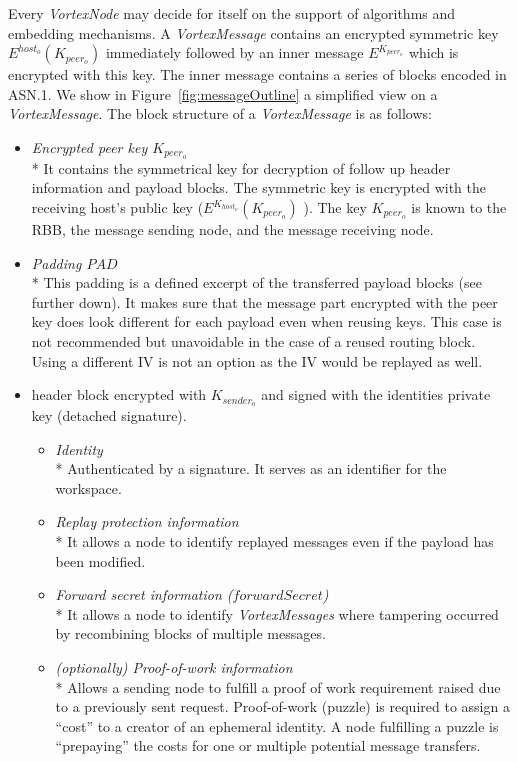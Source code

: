 \documentclass[acmsmall, screen, final]{acmart}
\begin{document}
	Every \emph{VortexNode} may decide for itself on the support of algorithms and embedding mechanisms. A \emph{VortexMessage} contains an encrypted symmetric key $E^{host_o}\left(K_{peer_o}\right)$ immediately followed by an inner message $E^{K_{peer_o}}$ which is encrypted with this key. The inner message contains a series of blocks encoded in ASN.1. We show in Figure~\ref{fig:messageOutline} a simplified view on a \emph{VortexMessage}. The block structure of a \emph{VortexMessage} is as follows:
	\begin{itemize}
		\item \emph{Encrypted peer key $K_{peer_o}$}\\*
		It contains the symmetrical key for decryption of follow up header information and payload blocks. The symmetric key is encrypted with the receiving host's public key ($E^{K_{host_o}}\left(K_{peer_o}\right)$ ). The key $K_{peer_o}$ is known to the RBB, the message sending node, and the message receiving node.
		\item \emph{Padding $PAD$}\\*
		This padding is a defined excerpt of the transferred payload blocks (see further down). It makes sure that the message part encrypted with the peer key does look different for each payload even when reusing keys. This case is not recommended but unavoidable in the case of a reused routing block. Using a different IV is not an option as the IV would be replayed as well.
		\item header block encrypted with $K_{sender_o}$ and signed with the identities private key (detached signature).
		\begin{itemize}
			\item \emph{Identity}\\*
			Authenticated by a signature. It serves as an identifier for the workspace.
			\item \emph{Replay protection information}\\*
			It allows a node to identify replayed messages even if the payload has been modified.
			\item \emph{Forward secret information ($forwardSecret$)}\\*
			It allows a node to identify \emph{VortexMessages} where tampering occurred by recombining blocks of multiple messages.      
			\item \emph{(optionally) Proof-of-work information}\\*
			Allows a sending node to fulfill a proof of work requirement raised due to a previously sent request. Proof-of-work (puzzle) is required to assign a ``cost'' to a creator of an ephemeral identity. A node fulfilling a puzzle is ``prepaying'' the costs for one or multiple potential message transfers. 

\end{itemize}
\end{itemize}
\end{document}

